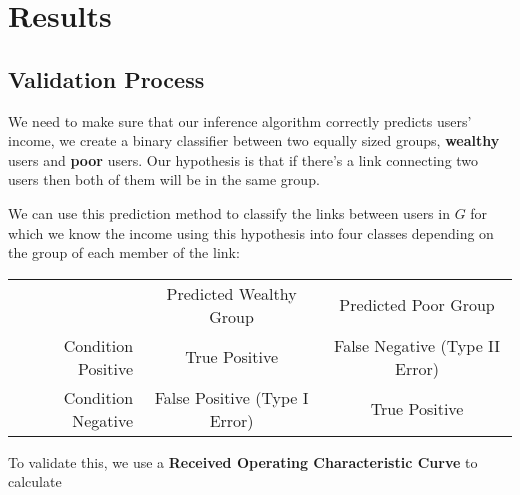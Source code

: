 \section{Results}

\subsection{Validation Process}

We need to make sure that our inference algorithm correctly predicts users' income, we create a binary classifier between two equally sized groups, \textbf{wealthy} users and \textbf{poor} users. Our hypothesis is that if there's a link connecting two users then both of them will be in the same group.

We can use this prediction method to classify the links between users in $ G $ for which we know the income using this hypothesis into four classes depending on the group of each member of the link:

\begin{tabularx}{\textwidth}{r|c|c}
& Predicted Wealthy Group & Predicted Poor Group \\
Condition Positive & True Positive & False Negative \newline (Type II Error) \\
Condition Negative & False Positive \newline (Type I Error) & True Positive
\end{tabularx}

To validate this, we use a \textbf{Received Operating Characteristic Curve} to calculate 